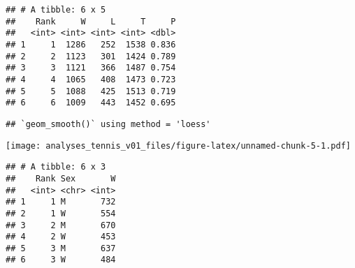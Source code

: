 \documentclass[]{article}
\newenvironment{Shaded}{\begin{snugshade}}{\end{snugshade}}
\newcommand{\DataTypeTok}[1]{\textcolor[rgb]{0.13,0.29,0.53}{#1}}
\newcommand{\DecValTok}[1]{\textcolor[rgb]{0.00,0.00,0.81}{#1}}
\newcommand{\KeywordTok}[1]{\textcolor[rgb]{0.13,0.29,0.53}{\textbf{#1}}}
\newcommand{\NormalTok}[1]{#1}
\newcommand{\OperatorTok}[1]{\textcolor[rgb]{0.81,0.36,0.00}{\textbf{#1}}}
\newcommand{\StringTok}[1]{\textcolor[rgb]{0.31,0.60,0.02}{#1}}
\begin{document}
\begin{verbatim}
## # A tibble: 6 x 5
##    Rank     W     L     T     P
##   <int> <int> <int> <int> <dbl>
## 1     1  1286   252  1538 0.836
## 2     2  1123   301  1424 0.789
## 3     3  1121   366  1487 0.754
## 4     4  1065   408  1473 0.723
## 5     5  1088   425  1513 0.719
## 6     6  1009   443  1452 0.695
\end{verbatim}

\begin{Shaded}
\end{Shaded}

\begin{verbatim}
## `geom_smooth()` using method = 'loess'
\end{verbatim}

\texttt{[image: analyses\_tennis\_v01\_files/figure-latex/unnamed-chunk-5-1.pdf]}

\begin{Shaded}
\end{Shaded}

\begin{verbatim}
## # A tibble: 6 x 3
##    Rank Sex       W
##   <int> <chr> <int>
## 1     1 M       732
## 2     1 W       554
## 3     2 M       670
## 4     2 W       453
## 5     3 M       637
## 6     3 W       484
\end{verbatim}
\end{document}
